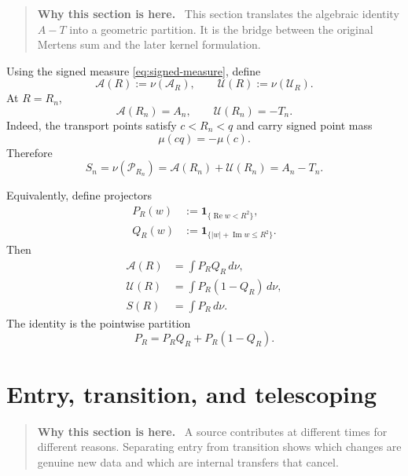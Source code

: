 \documentclass[11pt]{article}
\theoremstyle{definition}
\theoremstyle{remark}
\newcommand{\1}{\mathbf{1}}
\newcommand{\Repart}{\operatorname{Re}}
\newcommand{\Impart}{\operatorname{Im}}
\newenvironment{motivation}
  {\begin{quote}\small\color{ovvogray}\textbf{Why this section is here.}\ }
  {\end{quote}}
\begin{document}
\begin{motivation}
This section translates the algebraic identity $A-T$ into a geometric partition.  It is the bridge between the original Mertens sum and the later kernel formulation.
\end{motivation}

Using the signed measure \cref{eq:signed-measure}, define
\begin{equation}
 \mathcal A(R):=\nu(\mathscr A_R),
 \qquad
 \mathcal U(R):=\nu(\mathscr U_R).
 \label{eq:AU-measures}
\end{equation}
At $R=R_n$,
\begin{equation}
 \mathcal A(R_n)=A_n,
 \qquad
 \mathcal U(R_n)=-T_n.
 \label{eq:AU-AT}
\end{equation}
Indeed, the transport points satisfy $c<R_n<q$ and carry signed point mass
\[
 \mu(cq)=-\mu(c).
\]
Therefore
\begin{equation}
 \boxed{
 S_n
 =\nu(\mathscr P_{R_n})
 =\mathcal A(R_n)+\mathcal U(R_n)
 =A_n-T_n.
 }
 \label{eq:geometric-AT}
\end{equation}

Equivalently, define projectors
\begin{align}
 P_R(w)&:=\1_{\{\Repart w<R^2\}},
 \label{eq:P-projector}\\
 Q_R(w)&:=\1_{\{|w|+\Impart w\le R^2\}}.
 \label{eq:Q-projector}
\end{align}
Then
\begin{align}
 \mathcal A(R)&=\int P_RQ_R\,d\nu,
 \label{eq:A-projector}\\
 \mathcal U(R)&=\int P_R(1-Q_R)\,d\nu,
 \label{eq:U-projector}\\
 S(R)&=\int P_R\,d\nu.
 \label{eq:S-projector}
\end{align}
The identity is the pointwise partition
\begin{equation}
 P_R=P_RQ_R+P_R(1-Q_R).
 \label{eq:projector-partition}
\end{equation}

\section{Entry, transition, and telescoping}
\label{sec:telescoping}

\begin{motivation}
A source contributes at different times for different reasons.  Separating entry from transition shows which changes are genuine new data and which are internal transfers that cancel.
\end{motivation}
\end{document}

